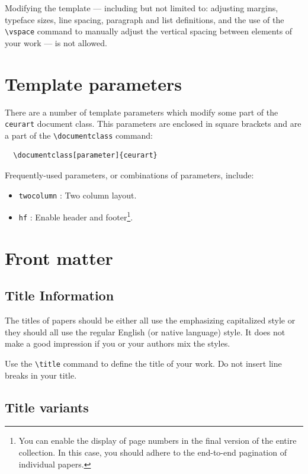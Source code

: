 \documentclass[
]{ceurart}
\begin{document}
Modifying the template --- including but not limited to: adjusting
margins, typeface sizes, line spacing, paragraph and list definitions,
and the use of the \verb|\vspace| command to manually adjust the
vertical spacing between elements of your work --- is not allowed.

\section{Template parameters}

There are a number of template
parameters which modify some part of the \verb|ceurart| document class.
This parameters are enclosed in square
brackets and are a part of the \verb|\documentclass| command:
\begin{lstlisting}
  \documentclass[parameter]{ceurart}
\end{lstlisting}

Frequently-used parameters, or combinations of parameters, include:
\begin{itemize}
\item \verb|twocolumn| : Two column layout.
\item \verb|hf| : Enable header and footer\footnote{You can enable
    the display of page numbers in the final version of the entire
    collection. In this case, you should adhere to the end-to-end
    pagination of individual papers.}.
\end{itemize}

\section{Front matter}

\subsection{Title Information}

The titles of papers should be either all use the emphasizing
capitalized style or they should all use the regular English (or
native language) style. It does not make a good impression if you or
your authors mix the styles.

Use the \verb|\title| command to define the title of your work. Do not
insert line breaks in your title.

\subsection{Title variants}
\end{document}
